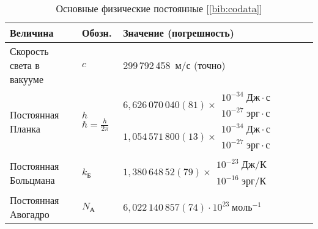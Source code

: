 \newcommand*{\z}{\phantom{0}}
\newcommand*{\zz}{\phantom{00}}
\pagestyle{empty}

\begin{booksupplement}
\begin{longtable}{p{46mm}>{\centering}p{14mm}p{45mm}}
\caption{Основные физические постоянные [\ref{bib:codata}]}\\
\toprule[1pt]
\textbf{Величина}     & \textbf{Обозн.} & \textbf{Значение (погрешность)} \\
\midrule[1pt]
Скорость света в вакууме
                      & $c$
                      & 299\,792\,458~м/с (точно)                         \\
Постоянная Планка     & \hfil$h$\newline \newline
                        $\hbar=\frac{h}{2\pi}$
                      & $6,626\,070\,040(81)\times \!\!
                            \begin{array}{l}
                                10^{-34}\;Дж\cdot с \\[-2pt]
                                10^{-27}\;эрг\cdot с
                            \end{array} $ \newline
                        $1,054\,571\,800(13)\times \!\!
                            \begin{array}{l}
                                10^{-34}\;Дж\cdot с \\[-2pt]
                                10^{-27}\;эрг\cdot с
                            \end{array}$                                 \\
Постоянная Больцмана  & $k_{Б}$
                      & $1,380\,648\,52(79)\times \!\!
                        \begin{array}{l}
                            10^{-23}\;Дж/К \\[-2pt]
                            10^{-16}\;эрг/К
                        \end{array}$                                    \\
Постоянная Авогадро   & $N_{А}$
                      & $6,022\,140\,857(74)\cdot 10^{23}~моль^{-1}$        \\

\end{longtable}
\end{booksupplement}
